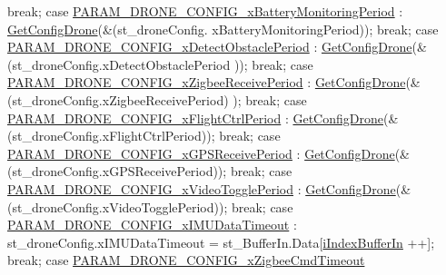 \begin{DoxyCode}
            \textcolor{keywordflow}{break};
        \textcolor{keywordflow}{case} \hyperlink{typdefUart_8h_a7fdf1e7bfbebe0c7a2eb84a10e069632adaafa83d8768d26374d1cca8f3c4914d}{PARAM\_DRONE\_CONFIG\_xBatteryMonitoringPeriod}
      :
            \hyperlink{classZigBee_a1817781f9b8e805bdd4eba25498714fe}{GetConfigDrone}(&(st\_droneConfig.
      xBatteryMonitoringPeriod));
            \textcolor{keywordflow}{break};
        \textcolor{keywordflow}{case} \hyperlink{typdefUart_8h_a7fdf1e7bfbebe0c7a2eb84a10e069632a70d207333012bb820cb3576f3fad9048}{PARAM\_DRONE\_CONFIG\_xDetectObstaclePeriod}
      :
            \hyperlink{classZigBee_a1817781f9b8e805bdd4eba25498714fe}{GetConfigDrone}(&(st\_droneConfig.xDetectObstaclePeriod
      ));
            \textcolor{keywordflow}{break};
        \textcolor{keywordflow}{case} \hyperlink{typdefUart_8h_a7fdf1e7bfbebe0c7a2eb84a10e069632a5c305ec532822ca3aa2ff74d0052f757}{PARAM\_DRONE\_CONFIG\_xZigbeeReceivePeriod}
      :
            \hyperlink{classZigBee_a1817781f9b8e805bdd4eba25498714fe}{GetConfigDrone}(&(st\_droneConfig.xZigbeeReceivePeriod)
      );
            \textcolor{keywordflow}{break};
        \textcolor{keywordflow}{case} \hyperlink{typdefUart_8h_a7fdf1e7bfbebe0c7a2eb84a10e069632a22871458b110498e27a8b6244d14fd4e}{PARAM\_DRONE\_CONFIG\_xFlightCtrlPeriod}
      :
            \hyperlink{classZigBee_a1817781f9b8e805bdd4eba25498714fe}{GetConfigDrone}(&(st\_droneConfig.xFlightCtrlPeriod));
            \textcolor{keywordflow}{break};
        \textcolor{keywordflow}{case} \hyperlink{typdefUart_8h_a7fdf1e7bfbebe0c7a2eb84a10e069632a80df4e54f488c528a0af260bf4287bcb}{PARAM\_DRONE\_CONFIG\_xGPSReceivePeriod}
      :
            \hyperlink{classZigBee_a1817781f9b8e805bdd4eba25498714fe}{GetConfigDrone}(&(st\_droneConfig.xGPSReceivePeriod));
            \textcolor{keywordflow}{break};
        \textcolor{keywordflow}{case} \hyperlink{typdefUart_8h_a7fdf1e7bfbebe0c7a2eb84a10e069632a590b78e1b29c0c8dcdf6d2dc869e43aa}{PARAM\_DRONE\_CONFIG\_xVideoTogglePeriod}
      :
            \hyperlink{classZigBee_a1817781f9b8e805bdd4eba25498714fe}{GetConfigDrone}(&(st\_droneConfig.xVideoTogglePeriod));
            \textcolor{keywordflow}{break};
        \textcolor{keywordflow}{case} \hyperlink{typdefUart_8h_a7fdf1e7bfbebe0c7a2eb84a10e069632a8bd205ac7401d53092ff7ffc98e754aa}{PARAM\_DRONE\_CONFIG\_xIMUDataTimeout}
      :
            st\_droneConfig.xIMUDataTimeout = st\_BufferIn.Data[\hyperlink{classZigBee_a2b6ec705974d8db622f3eb00efeb9ad8}{iIndexBufferIn}
      ++];
            \textcolor{keywordflow}{break};
        \textcolor{keywordflow}{case} \hyperlink{typdefUart_8h_a7fdf1e7bfbebe0c7a2eb84a10e069632afaa7777e435be6b471009c6cdf74c948}{PARAM\_DRONE\_CONFIG\_xZigbeeCmdTimeout}

\end{DoxyCode}
